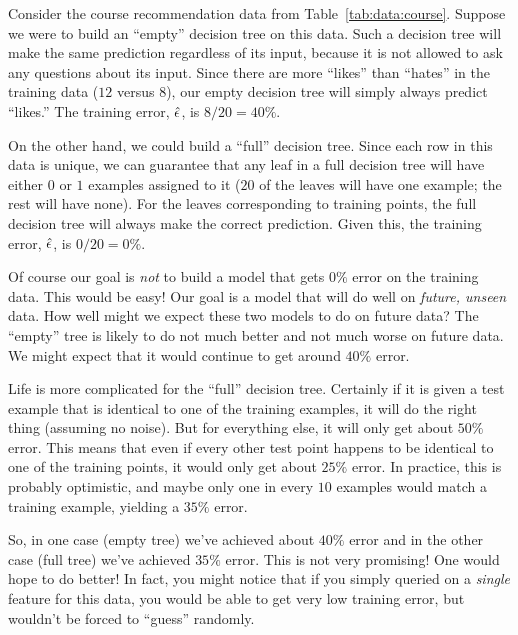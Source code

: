Consider the course recommendation data from
Table~\ref{tab:data:course}.  Suppose we were to build an ``empty''
decision tree on this data.  Such a decision tree will make the same
prediction regardless of its input, because it is not allowed to ask
any questions about its input.  Since there are more ``likes'' than
``hates'' in the training data ($12$ versus $8$), our empty decision
tree will simply always predict ``likes.''  The training error, $\hat
{\epsilon}$, is $8/20 = 40\%$.


On the other hand, we could build a ``full'' decision tree.  Since
each row in this data is unique, we can guarantee that any leaf in a
full decision tree will have either $0$ or $1$ examples assigned to it
($20$ of the leaves will have one example; the rest will have none).
For the leaves corresponding to training points, the full decision
tree will always make the correct prediction.  
Given this, the training error, $\hat {\epsilon}$, is $0/20 = 0\%$.

Of course our goal is \emph{not} to build a model that gets $0\%$
error on the training data.  This would be easy!  Our goal is a model
that will do well on \emph{future, unseen} data.  How well might we
expect these two models to do on future data?  The ``empty'' tree is
likely to do not much better and not much worse on future data.  We
might expect that it would continue to get around $40\%$ error.

Life is more complicated for the ``full'' decision tree.  Certainly if
it is given a test example that is identical to one of the training
examples, it will do the right thing (assuming no noise).  But for
everything else, it will only get about $50\%$ error.  This means that
even if every other test point happens to be identical to one of the
training points, it would only get about $25\%$ error.  In practice,
this is probably optimistic, and maybe only one in every $10$ examples
would match a training example, yielding a $35\%$ error.


So, in one case (empty tree) we've achieved about $40\%$ error and in
the other case (full tree) we've achieved $35\%$ error.  This is not
very promising!  One would hope to do better!  In fact, you might
notice that if you simply queried on a \emph{single} feature for this
data, you would be able to get very low training error, but wouldn't
be forced to ``guess'' randomly.

